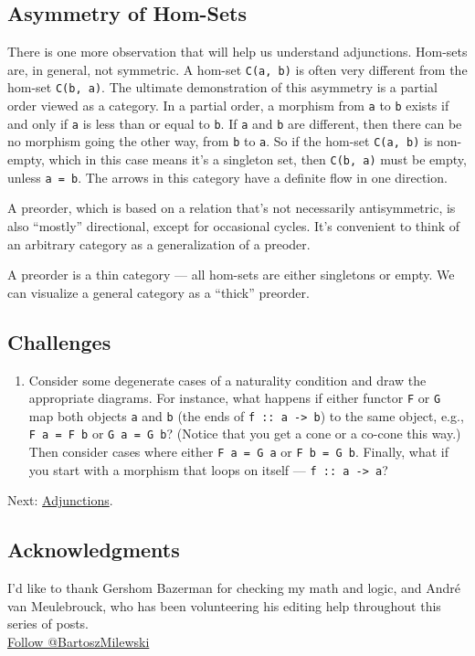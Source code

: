 \subsection{Asymmetry of Hom-Sets}\label{asymmetry-of-hom-sets}

There is one more observation that will help us understand adjunctions.
Hom-sets are, in general, not symmetric. A hom-set \texttt{C(a,\ b)} is
often very different from the hom-set \texttt{C(b,\ a)}. The ultimate
demonstration of this asymmetry is a partial order viewed as a category.
In a partial order, a morphism from \texttt{a} to \texttt{b} exists if
and only if \texttt{a} is less than or equal to \texttt{b}. If
\texttt{a} and \texttt{b} are different, then there can be no morphism
going the other way, from \texttt{b} to \texttt{a}. So if the hom-set
\texttt{C(a,\ b)} is non-empty, which in this case means it's a
singleton set, then \texttt{C(b,\ a)} must be empty, unless
\texttt{a\ =\ b}. The arrows in this category have a definite flow in
one direction.

A preorder, which is based on a relation that's not necessarily
antisymmetric, is also ``mostly'' directional, except for occasional
cycles. It's convenient to think of an arbitrary category as a
generalization of a preoder.

A preorder is a thin category --- all hom-sets are either singletons or
empty. We can visualize a general category as a ``thick'' preorder.

\subsection{Challenges}\label{challenges}

\begin{enumerate}
\tightlist
\item
  Consider some degenerate cases of a naturality condition and draw the
  appropriate diagrams. For instance, what happens if either functor
  \texttt{F} or \texttt{G} map both objects \texttt{a} and \texttt{b}
  (the ends of \texttt{f\ ::\ a\ -\textgreater{}\ b}) to the same
  object, e.g., \texttt{F\ a\ =\ F\ b} or \texttt{G\ a\ =\ G\ b}?
  (Notice that you get a cone or a co-cone this way.) Then consider
  cases where either \texttt{F\ a\ =\ G\ a} or \texttt{F\ b\ =\ G\ b}.
  Finally, what if you start with a morphism that loops on itself ---
  \texttt{f\ ::\ a\ -\textgreater{}\ a}?
\end{enumerate}

Next:
\href{https://bartoszmilewski.com/2016/04/18/adjunctions/}{Adjunctions}.

\subsection{Acknowledgments}\label{acknowledgments}

I'd like to thank Gershom Bazerman for checking my math and logic, and
André van Meulebrouck, who has been volunteering his editing help
throughout this series of posts.\\
\href{https://twitter.com/BartoszMilewski}{Follow @BartoszMilewski}
